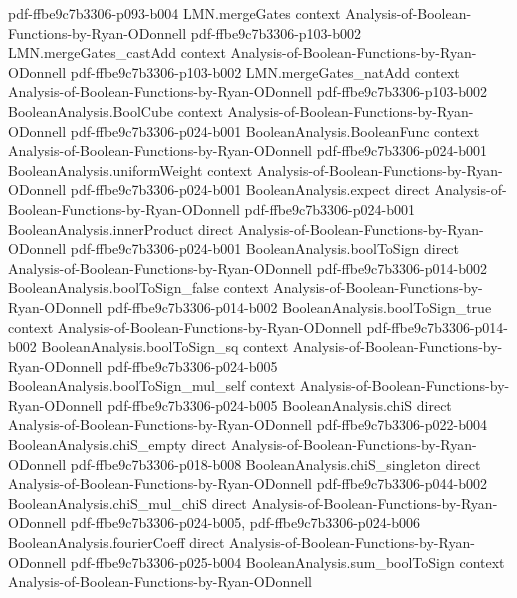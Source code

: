 \begin{theorem}
  {pdf-ffbe9c7b3306-p093-b004}
\proofstep
  {LMN.mergeGates}
  {context}
  {Analysis-of-Boolean-Functions-by-Ryan-ODonnell}
  {pdf-ffbe9c7b3306-p103-b002}
\proofstep
  {LMN.mergeGates_castAdd}
  {context}
  {Analysis-of-Boolean-Functions-by-Ryan-ODonnell}
  {pdf-ffbe9c7b3306-p103-b002}
\proofstep
  {LMN.mergeGates_natAdd}
  {context}
  {Analysis-of-Boolean-Functions-by-Ryan-ODonnell}
  {pdf-ffbe9c7b3306-p103-b002}
\proofstep
  {BooleanAnalysis.BoolCube}
  {context}
  {Analysis-of-Boolean-Functions-by-Ryan-ODonnell}
  {pdf-ffbe9c7b3306-p024-b001}
\proofstep
  {BooleanAnalysis.BooleanFunc}
  {context}
  {Analysis-of-Boolean-Functions-by-Ryan-ODonnell}
  {pdf-ffbe9c7b3306-p024-b001}
\proofstep
  {BooleanAnalysis.uniformWeight}
  {context}
  {Analysis-of-Boolean-Functions-by-Ryan-ODonnell}
  {pdf-ffbe9c7b3306-p024-b001}
\proofstep
  {BooleanAnalysis.expect}
  {direct}
  {Analysis-of-Boolean-Functions-by-Ryan-ODonnell}
  {pdf-ffbe9c7b3306-p024-b001}
\proofstep
  {BooleanAnalysis.innerProduct}
  {direct}
  {Analysis-of-Boolean-Functions-by-Ryan-ODonnell}
  {pdf-ffbe9c7b3306-p024-b001}
\proofstep
  {BooleanAnalysis.boolToSign}
  {direct}
  {Analysis-of-Boolean-Functions-by-Ryan-ODonnell}
  {pdf-ffbe9c7b3306-p014-b002}
\proofstep
  {BooleanAnalysis.boolToSign_false}
  {context}
  {Analysis-of-Boolean-Functions-by-Ryan-ODonnell}
  {pdf-ffbe9c7b3306-p014-b002}
\proofstep
  {BooleanAnalysis.boolToSign_true}
  {context}
  {Analysis-of-Boolean-Functions-by-Ryan-ODonnell}
  {pdf-ffbe9c7b3306-p014-b002}
\proofstep
  {BooleanAnalysis.boolToSign_sq}
  {context}
  {Analysis-of-Boolean-Functions-by-Ryan-ODonnell}
  {pdf-ffbe9c7b3306-p024-b005}
\proofstep
  {BooleanAnalysis.boolToSign_mul_self}
  {context}
  {Analysis-of-Boolean-Functions-by-Ryan-ODonnell}
  {pdf-ffbe9c7b3306-p024-b005}
\proofstep
  {BooleanAnalysis.chiS}
  {direct}
  {Analysis-of-Boolean-Functions-by-Ryan-ODonnell}
  {pdf-ffbe9c7b3306-p022-b004}
\proofstep
  {BooleanAnalysis.chiS_empty}
  {direct}
  {Analysis-of-Boolean-Functions-by-Ryan-ODonnell}
  {pdf-ffbe9c7b3306-p018-b008}
\proofstep
  {BooleanAnalysis.chiS_singleton}
  {direct}
  {Analysis-of-Boolean-Functions-by-Ryan-ODonnell}
  {pdf-ffbe9c7b3306-p044-b002}
\proofstep
  {BooleanAnalysis.chiS_mul_chiS}
  {direct}
  {Analysis-of-Boolean-Functions-by-Ryan-ODonnell}
  {pdf-ffbe9c7b3306-p024-b005,
    pdf-ffbe9c7b3306-p024-b006}
\proofstep
  {BooleanAnalysis.fourierCoeff}
  {direct}
  {Analysis-of-Boolean-Functions-by-Ryan-ODonnell}
  {pdf-ffbe9c7b3306-p025-b004}
\proofstep
  {BooleanAnalysis.sum_boolToSign}
  {context}
  {Analysis-of-Boolean-Functions-by-Ryan-ODonnell}

\end{theorem}
